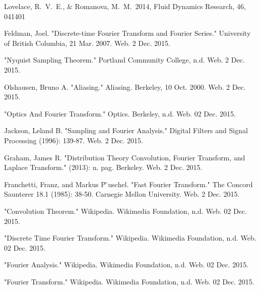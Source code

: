 \documentclass{article}
\begin{document}
\begin{thebibliography}{9}

	
	 Lovelace, R.~V.~E., \& Romanova, M.~M.\ 2014, Fluid Dynamics Research, 46, 041401 
	
	Feldman, Joel. "Discrete-time Fourier Transform and Fourier Series." University of British Columbia, 21 Mar. 2007. Web. 2 Dec. 2015.

	"Nyquist Sampling Theorem." Portland Community College, n.d. Web. 2 Dec. 2015.

	Olshausen, Bruno A. "Aliasing." Aliasing. Berkeley, 10 Oct. 2000. Web. 2 Dec. 2015.

	"Optics And Fourier Transform." Optics. Berkeley, n.d. Web. 02 Dec. 2015.
	
	Jackson, Leland B. "Sampling and Fourier Analysis." Digital Filters and Signal Processing (1996): 139-87. Web. 2 Dec. 2015.
	
	Graham, James R. "Distribution Theory Convolution, Fourier Transform, and Laplace Transform." (2013): n. pag. Berkeley. Web. 2 Dec. 2015.
	
	Franchetti, Franz, and Markus P ̈uschel. "Fast Fourier Transform." The Concord Saunterer 18.1 (1985): 38-50. Carnegie Mellon University. Web. 2 Dec. 2015.
	
	"Convolution Theorem." Wikipedia. Wikimedia Foundation, n.d. Web. 02 Dec. 2015.
	
	"Discrete Time Fourier Transform." Wikipedia. Wikimedia Foundation, n.d. Web. 02 Dec. 2015.
	
	"Fourier Analysis." Wikipedia. Wikimedia Foundation, n.d. Web. 02 Dec. 2015.
	
	"Fourier Transform." Wikipedia. Wikimedia Foundation, n.d. Web. 02 Dec. 2015.
\end{thebibliography}
\end{document}
